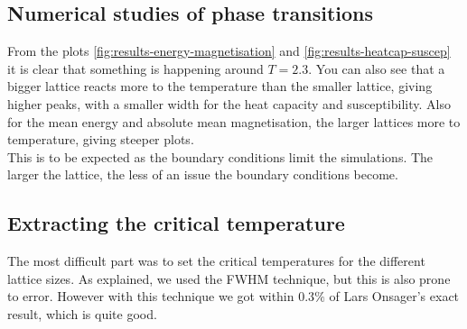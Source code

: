 \documentclass[../main.tex]{subfiles}
\begin{document}
\subsection{Numerical studies of phase transitions}
From the plots \ref{fig:results-energy-magnetisation} and \ref{fig:results-heatcap-suscep} it is clear that something is happening around $T = 2.3$. You can also see that a bigger lattice reacts more to the temperature than the smaller lattice, giving higher peaks, with a smaller width for the heat capacity and susceptibility. Also for the mean energy and absolute mean magnetisation, the larger lattices  more to temperature, giving steeper plots.\\
This is to be expected as the boundary conditions limit the simulations. The larger the lattice, the less of an issue the boundary conditions become.




\subsection{Extracting the critical temperature}
The most difficult part was to set the critical temperatures for the different lattice sizes. As explained, we used the FWHM technique, but this is also prone to error. However with this technique we got within $0.3\%$ of Lars Onsager's exact result, which is quite good.
\end{document}
